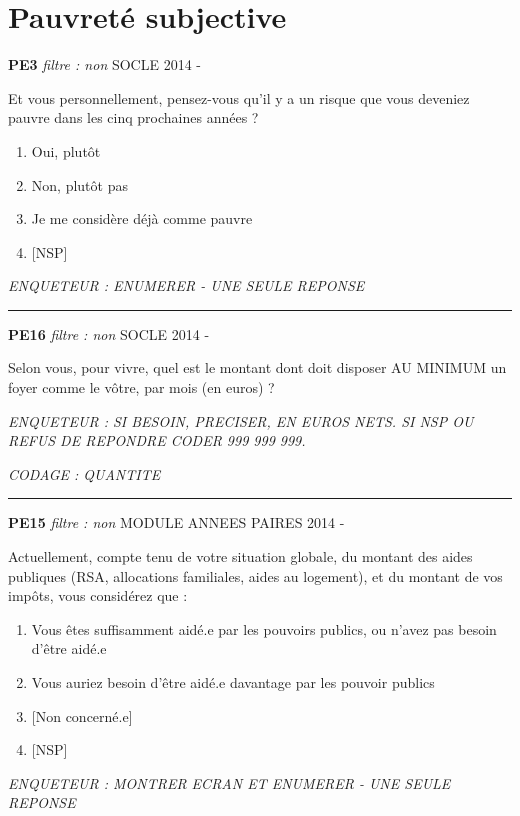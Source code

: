 \documentclass[12pt,a4paper]{reedthesis}
\providecommand{\tightlist}{%
  \setlength{\itemsep}{0pt}\setlength{\parskip}{0pt}}
\begin{document}
\hypertarget{pauvretuxe9-subjective-1}{%
\section{Pauvreté subjective}\label{pauvretuxe9-subjective-1}}

\textbf{PE3} \emph{filtre : non} SOCLE 2014 -

Et vous personnellement, pensez-vous qu'il y a un risque que vous deveniez pauvre dans les cinq prochaines années ?
\begin{enumerate}
\def\labelenumi{\arabic{enumi}.}
\tightlist
\item
  Oui, plutôt
\item
  Non, plutôt pas
\item
  Je me considère déjà comme pauvre
\item
  {[}NSP{]}
\end{enumerate}
\emph{ENQUETEUR : ENUMERER - UNE SEULE REPONSE}
\begin{center}\rule{0.5\linewidth}{0.5pt}\end{center}

\textbf{PE16} \emph{filtre : non} SOCLE 2014 -

Selon vous, pour vivre, quel est le montant dont doit disposer AU MINIMUM un foyer comme le vôtre, par mois (en euros) ?

\emph{ENQUETEUR : SI BESOIN, PRECISER, EN EUROS NETS. SI NSP OU REFUS DE REPONDRE CODER 999 999 999.}

\emph{CODAGE : QUANTITE}
\begin{center}\rule{0.5\linewidth}{0.5pt}\end{center}

\textbf{PE15} \emph{filtre : non} MODULE ANNEES PAIRES 2014 -

Actuellement, compte tenu de votre situation globale, du montant des aides publiques (RSA, allocations familiales, aides au logement), et du montant de vos impôts, vous considérez que :
\begin{enumerate}
\def\labelenumi{\arabic{enumi}.}
\tightlist
\item
  Vous êtes suffisamment aidé.e par les pouvoirs publics, ou n'avez pas besoin d'être aidé.e
\item
  Vous auriez besoin d'être aidé.e davantage par les pouvoir publics
\item
  {[}Non concerné.e{]}
\item
  {[}NSP{]}
\end{enumerate}
\emph{ENQUETEUR : MONTRER ECRAN ET ENUMERER - UNE SEULE REPONSE}
\end{document}
